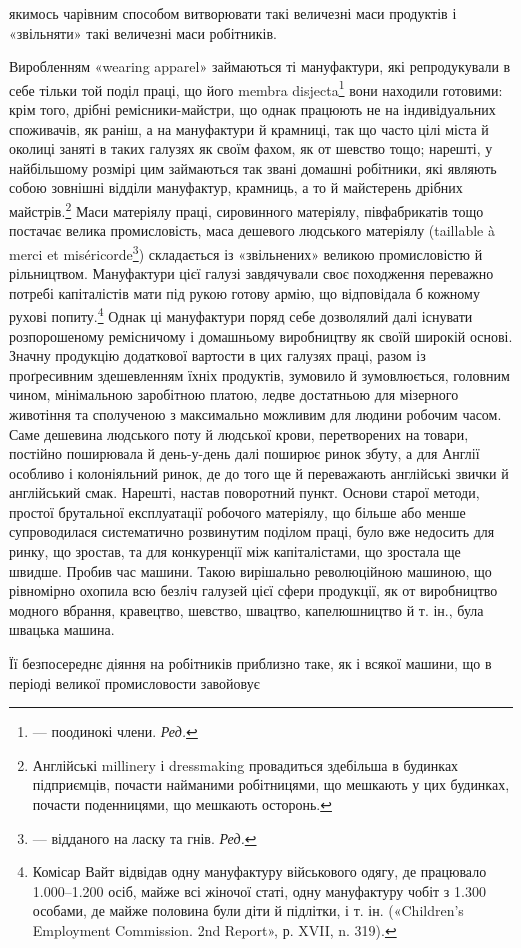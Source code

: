 \parcont{}  %
якимось чарівним способом витворювати такі величезні маси продуктів
і «звільняти» такі величезні маси робітників.

Виробленням «wearing apparel» займаються ті мануфактури,
які репродукували в себе тільки той поділ праці, що його membra
disjecta\footnote*{
— поодинокі члени. \emph{Ред.}
} вони находили готовими: крім того, дрібні ремісники-майстри,
що однак працюють не на індивідуальних споживачів,
як раніш, а на мануфактури й крамниці, так що часто цілі міста
й околиці заняті в таких галузях як своїм фахом, як от шевство
тощо; нарешті, у найбільшому розмірі цим займаються так звані
домашні робітники, які являють собою зовнішні відділи мануфактур,
крамниць, а то й майстерень дрібних майстрів.\footnote{
Англійські millinery і dressmaking провадиться здебільша в
будинках підприємців, почасти найманими робітницями, що мешкають
у цих будинках, почасти поденницями, що мешкають осторонь.
} Маси матеріялу праці, сировинного матеріялу, півфабрикатів тощо
постачає велика промисловість, маса дешевого людського матеріялу
(taillable à merci et miséricorde\footnote*{
— відданого на ласку та гнів. \emph{Ред.}
}) складається із «звільнених»
великою промисловістю й рільництвом. Мануфактури
цієї галузі завдячували своє походження переважно потребі капіталістів
мати під рукою готову армію, що відповідала б кожному
рухові попиту.\footnote{
Комісар Вайт відвідав одну мануфактуру військового одягу,
де працювало \num{1.000}--\num{1.200} осіб, майже всі жіночої статі, одну мануфактуру
чобіт з \num{1.300} особами, де майже половина були діти й підлітки, і
т. ін. («Children’s Employment Commission. 2nd Report», р. XVII,
n. 319).
} Однак ці мануфактури поряд себе дозволялий далі
існувати розпорошеному ремісничому і домашньому виробництву
як своїй широкій основі. Значну продукцію додаткової вартости
в цих галузях праці, разом із проґресивним здешевленням їхніх
продуктів, зумовило й зумовлюється, головним чином, мінімальною
заробітною платою, ледве достатньою для мізерного животіння
та сполученою з максимально можливим для людини робочим
часом. Саме дешевина людського поту й людської крови, перетворених
на товари, постійно поширювала й день-у-день далі поширює
ринок збуту, а для Англії особливо і колоніяльний ринок, де
до того ще й переважають англійські звички й англійський смак.
Нарешті, настав поворотний пункт. Основи старої методи, простої
брутальної експлуатації робочого матеріялу, що більше або
менше супроводилася систематично розвинутим поділом праці,
було вже недосить для ринку, що зростав, та для конкуренції
між капіталістами, що зростала ще швидше. Пробив час машини.
Такою вирішально революційною машиною, що рівномірно охопила
всю безліч галузей цієї сфери продукції, як от виробництво
модного вбрання, кравецтво, шевство, швацтво, капелюшництво
й т. ін., була швацька машина.

Її безпосереднє діяння на робітників приблизно таке, як і
всякої машини, що в періоді великої промисловости завойовує
\parbreak{}  %
